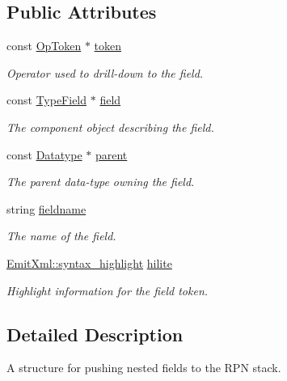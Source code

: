 \subsection*{Public Attributes}
\begin{DoxyCompactItemize}
\item 
const \mbox{\hyperlink{class_op_token}{Op\+Token}} $\ast$ \mbox{\hyperlink{struct_partial_symbol_entry_ab6fd2eded59cdec7422bbf6c49e46f63}{token}}
\begin{DoxyCompactList}\small\item\em Operator used to drill-\/down to the field. \end{DoxyCompactList}\item 
const \mbox{\hyperlink{struct_type_field}{Type\+Field}} $\ast$ \mbox{\hyperlink{struct_partial_symbol_entry_ab70c112a5a6a83784896b1834f9398f4}{field}}
\begin{DoxyCompactList}\small\item\em The component object describing the field. \end{DoxyCompactList}\item 
const \mbox{\hyperlink{class_datatype}{Datatype}} $\ast$ \mbox{\hyperlink{struct_partial_symbol_entry_a71ae1afca5857bc5e1834a1393683bdd}{parent}}
\begin{DoxyCompactList}\small\item\em The parent data-\/type owning the field. \end{DoxyCompactList}\item 
string \mbox{\hyperlink{struct_partial_symbol_entry_a10cb26ea8e9f2c70ab883e1094fd6a32}{fieldname}}
\begin{DoxyCompactList}\small\item\em The name of the field. \end{DoxyCompactList}\item 
\mbox{\hyperlink{class_emit_xml_a7c3577436da429c3c75f4b82cac6864f}{Emit\+Xml\+::syntax\+\_\+highlight}} \mbox{\hyperlink{struct_partial_symbol_entry_a6ae42a52fe2ac08f4d25c357881f2a7f}{hilite}}
\begin{DoxyCompactList}\small\item\em Highlight information for the field token. \end{DoxyCompactList}\end{DoxyCompactItemize}


\subsection{Detailed Description}
A structure for pushing nested fields to the R\+PN stack. 

